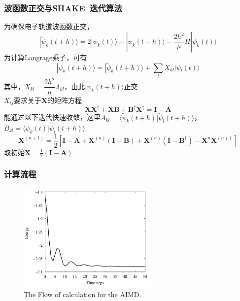 \documentclass[cjk,slidestop,compress,mathserif,blue]{beamer}
\begin{document}
\frame
{
	\frametitle{波函数正交与\rm{SHAKE~}迭代算法}
	为确保电子轨道波函数正交，
	{\fontsize{9.0pt}{5.2pt}\selectfont
	\begin{displaymath}
		|\tilde\psi_k(t+h)\rangle=2|\psi_k(t)\rangle-|\psi_k(t-h)\rangle-\dfrac{2h^2}{\mu}H|\psi_k(t)\rangle
	\end{displaymath}}
	为计算\textrm{Langrage}乘子，可有
	{\fontsize{9.0pt}{5.2pt}\selectfont
	\begin{displaymath}
		|\psi_k(t+h)\rangle=|\tilde\psi_k(t+h)\rangle+\sum_lX_{kl}|\psi_l(t)\rangle
	\end{displaymath}}
	其中，{\fontsize{9.0pt}{5.2pt}\selectfont$X_{kl}=\dfrac{2h^2}{\mu}\Lambda_{kl}$}，由此$|\psi_k(t+h)\rangle$正交\\
	$X_{ij}$要求关于$\mathbf{X}$的矩阵方程
	{\fontsize{9.0pt}{5.2pt}\selectfont
	\begin{displaymath}
		\mathbf{X}\mathbf{X}^{\dag}+\mathbf{X}\mathbf{B}+\mathbf{B}^{\dag}\mathbf{X}^{\dag}=\mathbf{I}-\mathbf{A}
	\end{displaymath}}
	能通过以下迭代快速收敛，这里{\fontsize{9.0pt}{5.2pt}\selectfont$A_{kl}=\langle\tilde\psi_k(t+h)|\tilde\psi_l(t+h)\rangle$}，{\fontsize{9.0pt}{5.2pt}\selectfont$B_{kl}=\langle\psi_k(t)|\tilde\psi_l(t+h)\rangle$}
	{\fontsize{9.0pt}{5.2pt}\selectfont
	\begin{displaymath}
		\mathbf{X}^{(n+1)}=\frac12[\mathbf{I}-\mathbf{A}+\mathbf{X}^{(n)}(\mathbf{I}-\mathbf{B})+\mathbf{X}^{(n)}(\mathbf{I}-\mathbf{B}^{\dag})-\mathbf{X}^{n}\mathbf{X}^{(n){\dag}}]
		\end{displaymath}}
	取初始{\fontsize{9.0pt}{5.2pt}\selectfont$\mathbf{X}=\frac12(\mathbf{I}-\mathbf{A})$}
}

\frame
{
	\frametitle{计算流程}
\begin{figure}[h!]
	\vspace{-0.2in}
\centering
\includegraphics[height=2.1in,width=2.7in,viewport=0 0 740 600,clip]{Figures/Ab-initio-Ene.png}
\caption{\tiny \textrm{The Flow of calculation for the AIMD.}}%
\label{PAW_AIMD}
\end{figure} 
}
\end{document}
